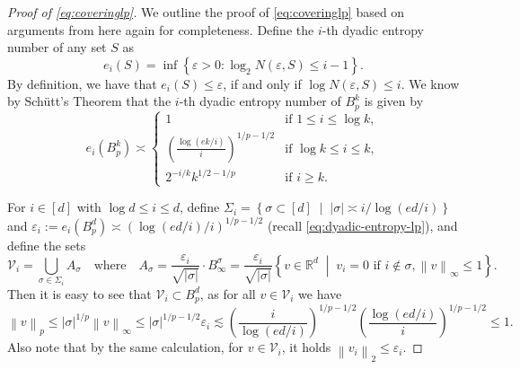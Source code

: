 \documentclass[a4paper]{article}
\newcommand{\mathset}[1]{\left\{#1\right\}}
\newcommand{\pr}[1]{\left(#1\right)}
\newcommand{\abs}[1]{\left\lvert#1\right\rvert}
\newcommand{\norm}[1]{\left\|#1\right\|}
\newcommand{\setmid}[0]{\;\middle|\;}
\newcommand{\RR}[0]{\mathbb{R}}
\newcommand{\cV}[0]{\mathcal{V}}
\newcommand{\eps}[0]{\varepsilon}
\theoremstyle{thmstyle}
\theoremstyle{defstyle}
\theoremstyle{remark}
\begin{document}
\begin{proof}[Proof of \eqref{eq:coveringlp}]
    We outline the proof of \eqref{eq:coveringlp} based on arguments from \cite{Kur2024minimum} here again for completeness.     
    Define the $i$-th dyadic entropy number of any set $S$ as 
    \begin{equation*}
        e_i(S)=\inf\mathset{\eps>0 : \log_2 N(\eps,S) \leq i-1}.
    \end{equation*}
    By definition, we have that $e_i(S)\leq \eps$, if and only if $\log N(\eps,S)\leq i$. We know by Schütt's Theorem \citep{Schutt1984entropy} that the $i$-th dyadic entropy number of $B_p^k$ is given by
    \begin{equation}
    \label{eq:dyadic-entropy-lp}
        e_i(B_p^k) \asymp 
        \begin{cases}
            1 & \text{if } 1\leq i \leq \log k,\\
            \pr{\frac{\log(ek/i)}{i}}^{1/p-1/2} & \text{if } \log k \leq i \leq k, \\
            2^{-i/k}k^{1/2-1/p} & \text{if } i\geq k.
        \end{cases}
    \end{equation}
    
    For $i \in [d]$ with $\log d \leq i \leq d$, define $\Sigma_i = \mathset{\sigma\subset [d]\setmid \abs{\sigma}\asymp i/\log(ed/i)}$
    and $\eps_i := e_i(B_p^d) \asymp (\log(ed/i)/i)^{1/p-1/2}$ (recall \eqref{eq:dyadic-entropy-lp}), and define the sets
    \begin{equation*}
        \cV_i = \bigcup_{\sigma \in \Sigma_i} A_\sigma \quad \text{where} \quad A_\sigma =   \frac{\eps_i}{\sqrt{\abs{\sigma}}} \cdot B_\infty^\sigma = \frac{\eps_i}{\sqrt{\abs{\sigma}}} \mathset{v\in \RR^d\setmid v_i= 0 \text{ if }i\notin \sigma, \norm{v}_\infty \leq 1}.
    \end{equation*}
    Then it is easy to see that $\cV_i \subset B_p^d$, as for all $v\in \cV_i$ we have
    \begin{equation*}
        \norm{v}_p \leq \abs{\sigma}^{1/p} \norm{v}_\infty \leq \abs{\sigma}^{1/p-1/2} \eps_i \lesssim \pr{\frac{i}{\log (ed/i)}}^{1/p-1/2} \pr{\frac{\log(ed/i)}{i}}^{1/p-1/2} \leq 1.
    \end{equation*}
    Also note that by the same calculation, for $v\in \cV_i$, it holds $\norm{v_i}_2\leq \eps_i$.


\end{proof}
\end{document}
